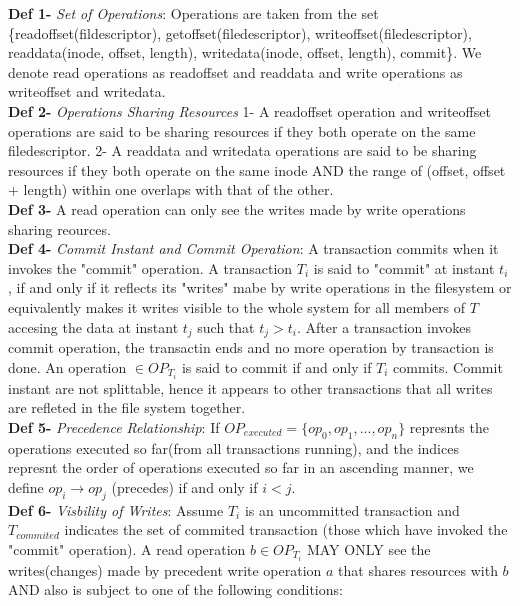 \documentclass[a4paper, 11pt]{article}
\begin{document}
\textbf{Def 1-} \emph{Set of Operations}: Operations are taken from the set \{readoffset(fildescriptor), getoffset(filedescriptor), writeoffset(filedescriptor), readdata(inode, offset, length), writedata(inode, offset, length), commit\}. We denote read operations as readoffset and readdata and write operations as writeoffset and writedata.\\

\textbf{Def 2-} \emph{Operations Sharing Resources} 1- A readoffset operation and writeoffset operations are said to be sharing resources if they both operate on the same filedescriptor. 2- A readdata and writedata operations are said to be sharing resources if they both operate on the same inode AND the range of (offset, offset + length) within one overlaps with that of the other.\\ 

\textbf{Def 3-} A read operation can only see the writes made by write operations sharing reources.\\ 

\textbf{Def 4-} \emph{Commit Instant and Commit Operation}: A transaction commits when it invokes the "commit" operation. A transaction $T_i$ is said to "commit" at instant $t_i$, if and only if it reflects its "writes" mabe by write operations in the filesystem or equivalently makes it writes visible to the whole system for all members of $T$ accesing the data at instant $t_j$ such that $t_j > t_i$. After a transaction invokes commit operation, the transactin ends and no more operation by transaction is done. An operation $\in OP_{T_i}$ is said to commit if and only if $T_i$ commits. Commit instant are not splittable, hence it appears to other transactions that all writes are refleted in the file system together.\\ 

\textbf{Def 5-} \emph{Precedence Relationship}: If $OP_{executed} = \{op_0, op_1, ..., op_n\}$ represnts the operations executed so far(from all transactions running), and the indices represnt the order of operations executed so far in an ascending manner, we define $op_i \rightarrow op_j$ (precedes) if and only if $i<j$.\\ 

\textbf{Def 6-} \emph{Visbility of Writes}: Assume $T_i$ is an uncommitted transaction and $T_{commited}$ indicates the set of commited transaction (those which have invoked the "commit" operation). A read operation $b \in OP_{T_i}$ MAY ONLY see the writes(changes) made by precedent write operation $a$ that shares resources with $b$ AND also is subject to one of the following conditions:\\
\end{document}
